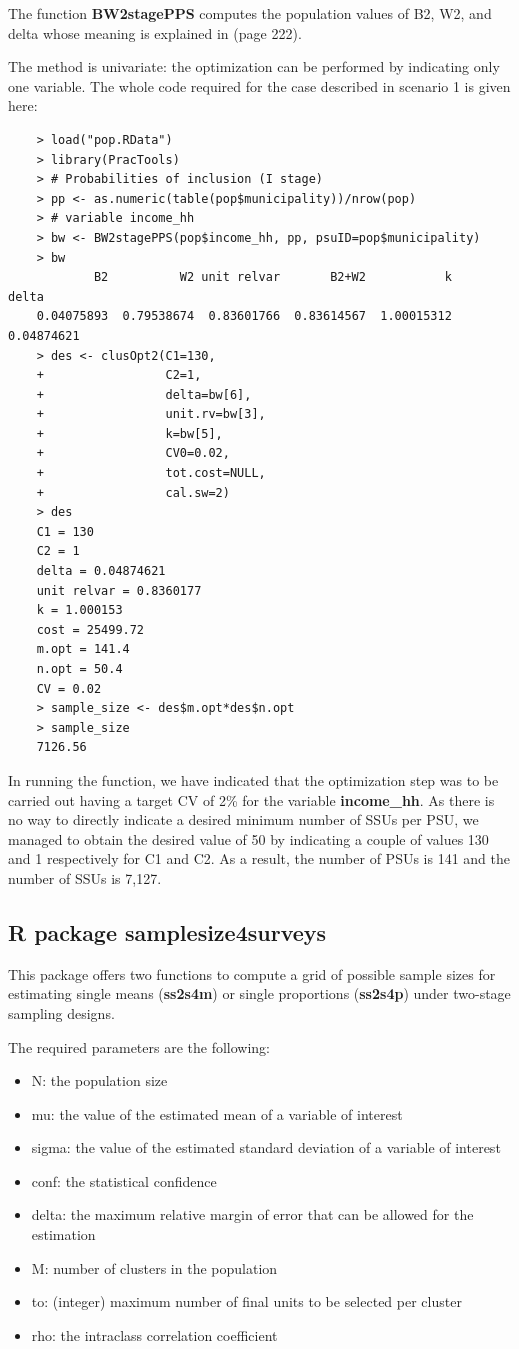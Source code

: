 The function \textbf{BW2stagePPS} computes the population values of B2, W2, and delta whose meaning is explained in \cite{Valliant:2015} (page 222).

The method is univariate: the optimization can be performed by indicating only one variable. The whole code required for the case described in scenario 1 is given here:

\begin{verbatim}
	> load("pop.RData")
	> library(PracTools)
	> # Probabilities of inclusion (I stage)
	> pp <- as.numeric(table(pop$municipality))/nrow(pop)
	> # variable income_hh
	> bw <- BW2stagePPS(pop$income_hh, pp, psuID=pop$municipality)
	> bw
	        B2          W2 unit relvar       B2+W2           k       delta 
	0.04075893  0.79538674  0.83601766  0.83614567  1.00015312  0.04874621 
	> des <- clusOpt2(C1=130,
	+                 C2=1,
	+                 delta=bw[6],
	+                 unit.rv=bw[3],
	+                 k=bw[5],
	+                 CV0=0.02,
	+                 tot.cost=NULL,
	+                 cal.sw=2)
	> des
	C1 = 130
	C2 = 1
	delta = 0.04874621
	unit relvar = 0.8360177
	k = 1.000153
	cost = 25499.72
	m.opt = 141.4
	n.opt = 50.4
	CV = 0.02
	> sample_size <- des$m.opt*des$n.opt
	> sample_size
	7126.56 
\end{verbatim}

In running the function, we have indicated that the optimization step was to be carried out having a target CV of 2\% for the variable \textbf{income\_hh}. As there is no way to directly indicate a desired minimum number of SSUs per PSU, we managed to obtain the desired value of 50 by indicating a couple of values 130 and 1 respectively for C1 and C2. As a result, the number of PSUs is 141 and the number of SSUs is 7,127.

\subsection{R package samplesize4surveys}

This package offers two functions to compute a grid of possible sample sizes for estimating single means (\textbf{ss2s4m}) or single proportions (\textbf{ss2s4p}) under two-stage sampling designs.

The required parameters are the following:

\begin{itemize}
	\item N: the population size
	\item mu: the value of the estimated mean of a variable of interest
	\item sigma: the value of the estimated standard deviation of a variable of interest
	\item conf: the statistical confidence
	\item delta: the maximum relative margin of error that can be allowed for the estimation
	\item M: number of clusters in the population
	\item to: (integer) maximum number of final units to be selected per cluster
	\item rho: the intraclass correlation coefficient
\end{itemize}

